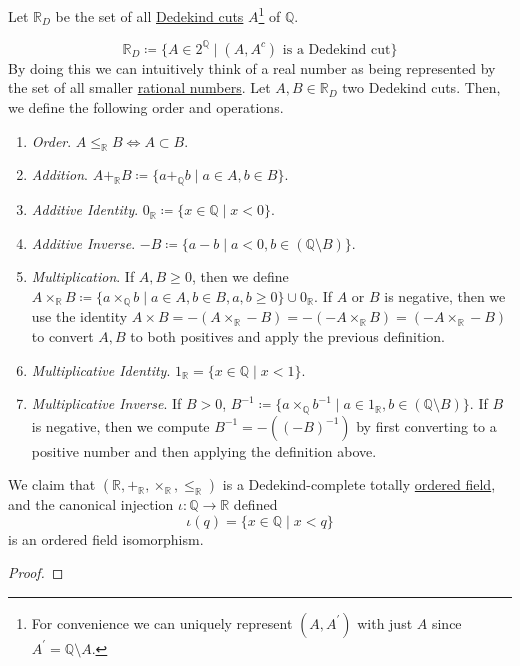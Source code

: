   \begin{definition}
    \label{def:reals-as-the-dedekind-completion-of-rationals}
    Let $\mathbb{R}_D$ be the set of all \hyperref[def:dedekind-cut]{Dedekind cuts} $A$\footnote{For convenience we can uniquely represent $(A, A^\prime)$ with just $A$ since $A^\prime = \mathbb{Q} \setminus A$. }  of $\mathbb{Q}$. 

    \begin{equation}
      \mathbb{R}_D \coloneqq \{ A \in 2^{\mathbb{Q}} \mid (A, A^c) \text{ is a Dedekind cut}\}
    \end{equation}
    By doing this we can intuitively think of a real number as being represented by the set of all smaller \hyperref[alg-def:rational-numbers]{rational numbers}. Let $A, B \in \mathbb{R}_D$ two Dedekind cuts. Then, we define the following order and operations. 
    \begin{enumerate}
      \item \textit{Order}. $A \leq_{\mathbb{R}} B \iff A \subset B$. 
      \item \textit{Addition}. $A +_{\mathbb{R}} B \coloneqq \{ a +_{\mathbb{Q}} b \mid a \in A, b \in B \}$. 
      \item \textit{Additive Identity}. $0_{\mathbb{R}} \coloneqq \{x \in \mathbb{Q} \mid x < 0 \}$. 
      \item \textit{Additive Inverse}. $-B \coloneqq \{ a - b \mid a < 0 , b \in (\mathbb{Q} \setminus B) \}$.
      \item \textit{Multiplication}. If $A, B \geq 0$, then we define $A \times_{\mathbb{R}} B \coloneqq \{ a \times_{\mathbb{Q}} b \mid a \in A, b \in B, a, b \geq 0\} \cup 0_{\mathbb{R}}$. If $A$ or $B$ is negative, then we use the identity $A \times B = -(A \times_{\mathbb{R}} -B) = -(-A \times_{\mathbb{R}} B) = (-A \times_{\mathbb{R}} -B)$ to convert $A, B$ to both positives and apply the previous definition. 
      \item \textit{Multiplicative Identity}. $1_{\mathbb{R}} = \{x \in \mathbb{Q} \mid x < 1 \}$. 
      \item \textit{Multiplicative Inverse}. If $B > 0$, $B^{-1} \coloneqq \{ a \times_{\mathbb{Q}} b^{-1} \mid a \in 1_{\mathbb{R}}, b \in (\mathbb{Q} \setminus B) \}$. If $B$ is negative, then we compute $B^{-1} = -((-B)^{-1})$ by first converting to a positive number and then applying the definition above. 
    \end{enumerate}

    We claim that $(\mathbb{R}, +_{\mathbb{R}}, \times_{\mathbb{R}}, \leq_{\mathbb{R}})$ is a Dedekind-complete totally \hyperref[alg-def:ordered-field]{ordered field}, and the canonical injection $\iota: \mathbb{Q} \rightarrow \mathbb{R}$ defined 
    \begin{equation}
      \iota(q) = \{x \in \mathbb{Q} \mid x < q \}
    \end{equation}
    is an ordered field isomorphism. 
  \end{definition} 
  \begin{proof}
    
  \end{proof}


